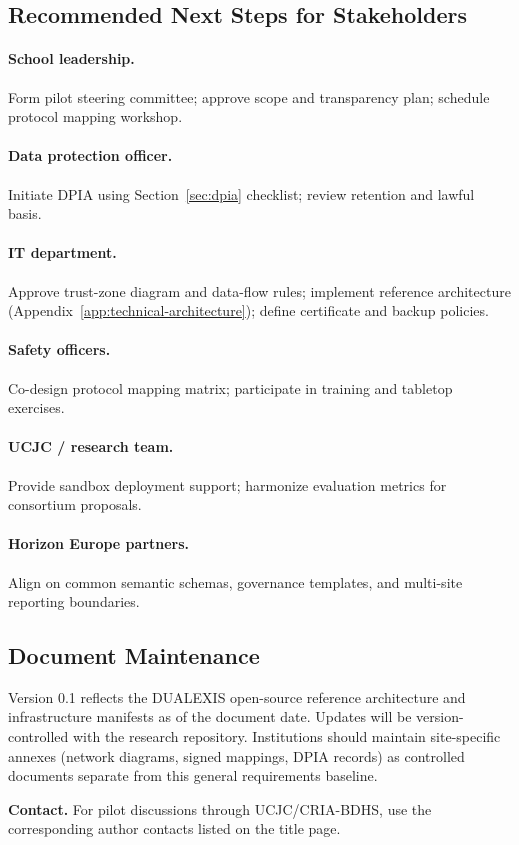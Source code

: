 \subsection{Recommended Next Steps for Stakeholders}

\paragraph{School leadership.}
Form pilot steering committee; approve scope and transparency plan; schedule protocol mapping workshop.

\paragraph{Data protection officer.}
Initiate DPIA using Section~\ref{sec:dpia} checklist; review retention and lawful basis.

\paragraph{IT department.}
Approve trust-zone diagram and data-flow rules; implement reference architecture
(Appendix~\ref{app:technical-architecture}); define certificate and backup policies.

\paragraph{Safety officers.}
Co-design protocol mapping matrix; participate in training and tabletop exercises.

\paragraph{UCJC / research team.}
Provide sandbox deployment support; harmonize evaluation metrics for consortium proposals.

\paragraph{Horizon Europe partners.}
Align on common semantic schemas, governance templates, and multi-site reporting boundaries.

\subsection{Document Maintenance}

Version 0.1 reflects the DUALEXIS open-source reference architecture and infrastructure
manifests as of the document date.
Updates will be version-controlled with the research repository.
Institutions should maintain site-specific annexes (network diagrams, signed mappings, DPIA records)
as controlled documents separate from this general requirements baseline.

\vspace{1em}
\noindent\textbf{Contact.} For pilot discussions through UCJC/CRIA-BDHS, use the corresponding
author contacts listed on the title page.
